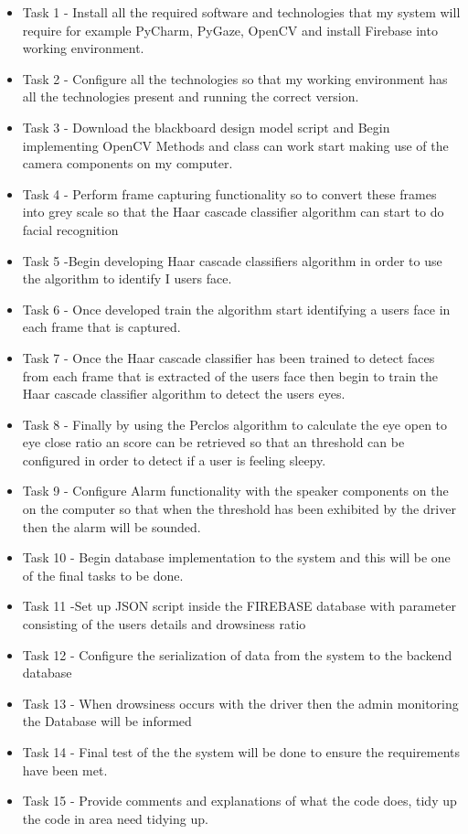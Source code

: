 \begin{itemize}
\item Task 1 - Install all the required software and technologies that my system will require for example PyCharm, PyGaze, OpenCV and install Firebase into working environment.
\item Task 2 - Configure all the technologies so that my working environment has all the technologies present and running the correct version. 
\item Task 3 - Download the blackboard design model script and Begin implementing OpenCV Methods and class can work start making use of the camera components on my computer. 
\item Task 4 - Perform frame capturing functionality so to convert these frames into grey scale so that the Haar cascade classifier algorithm can start to do facial recognition 
\item Task 5 -Begin developing Haar cascade classifiers algorithm in order to use the algorithm to identify I users face.
\item Task 6 - Once developed train the algorithm start identifying a users face in each frame that is captured. 
\item Task 7 - Once the Haar cascade classifier has been trained to detect faces from each frame that is extracted of the users face then begin to train the Haar cascade classifier algorithm to detect the users eyes.  
\item Task 8 - Finally by using the Perclos algorithm to calculate the eye open to eye close ratio an score can be retrieved so that an threshold can be configured in order to detect if a user is feeling sleepy. 
\item Task 9 - Configure Alarm functionality with the speaker components on the on the computer so that when the threshold has been exhibited by the driver then the alarm will be sounded.
\item Task 10 - Begin database implementation to the system and this will be one of the final tasks to be done.
\item Task 11 -Set up JSON script inside the FIREBASE database with parameter consisting of the users details and drowsiness ratio 
\item Task 12 - Configure the serialization of data from the system to the backend database 
\item Task 13 - When drowsiness occurs with the driver then the admin monitoring the Database will be informed
\item Task 14 - Final test of the the system will be done to ensure the requirements have been met.
\item Task 15 - Provide comments and explanations of what the code does, tidy up the code in area need tidying up. 
\end{itemize}

